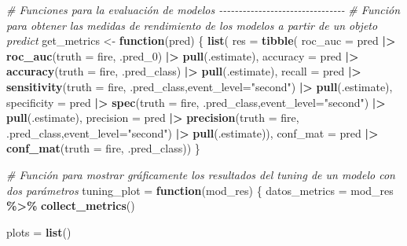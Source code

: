 \documentclass[12pt,a4paper,]{book}
\newenvironment{Shaded}{\begin{snugshade}}{\end{snugshade}}
\newcommand{\AttributeTok}[1]{\textcolor[rgb]{0.13,0.29,0.53}{#1}}
\newcommand{\CommentTok}[1]{\textcolor[rgb]{0.56,0.35,0.01}{\textit{#1}}}
\newcommand{\ControlFlowTok}[1]{\textcolor[rgb]{0.13,0.29,0.53}{\textbf{#1}}}
\newcommand{\FunctionTok}[1]{\textcolor[rgb]{0.13,0.29,0.53}{\textbf{#1}}}
\newcommand{\NormalTok}[1]{#1}
\newcommand{\OtherTok}[1]{\textcolor[rgb]{0.56,0.35,0.01}{#1}}
\newcommand{\SpecialCharTok}[1]{\textcolor[rgb]{0.81,0.36,0.00}{\textbf{#1}}}
\newcommand{\StringTok}[1]{\textcolor[rgb]{0.31,0.60,0.02}{#1}}
\numberwithin{dummy}{section}
\theoremstyle{ocrenumbox}
\theoremstyle{blacknumex}
\theoremstyle{blacknumbox}
\theoremstyle{ocrenum}
\theoremstyle{ocrenum}
\begin{document}
\begin{Shaded}
\begin{Highlighting}[]
\CommentTok{\# Funciones para la evaluación de modelos {-}{-}{-}{-}{-}{-}{-}{-}{-}{-}{-}{-}{-}{-}{-}{-}{-}{-}{-}{-}{-}{-}{-}{-}{-}{-}{-}{-}{-}{-}{-}{-}}
\CommentTok{\# Función para obtener las medidas de rendimiento de los modelos a partir de un objeto predict }
\NormalTok{get\_metrics }\OtherTok{\textless{}{-}} \ControlFlowTok{function}\NormalTok{(pred) \{}
  \FunctionTok{list}\NormalTok{(}
    \AttributeTok{res =} \FunctionTok{tibble}\NormalTok{(}
      \AttributeTok{roc\_auc =}\NormalTok{ pred }\SpecialCharTok{|\textgreater{}} \FunctionTok{roc\_auc}\NormalTok{(}\AttributeTok{truth =}\NormalTok{ fire, .pred\_0) }\SpecialCharTok{|\textgreater{}} \FunctionTok{pull}\NormalTok{(.estimate),}
      \AttributeTok{accuracy =}\NormalTok{ pred }\SpecialCharTok{|\textgreater{}} \FunctionTok{accuracy}\NormalTok{(}\AttributeTok{truth =}\NormalTok{ fire, .pred\_class) }\SpecialCharTok{|\textgreater{}} \FunctionTok{pull}\NormalTok{(.estimate),}
      \AttributeTok{recall =}\NormalTok{ pred }\SpecialCharTok{|\textgreater{}} \FunctionTok{sensitivity}\NormalTok{(}\AttributeTok{truth =}\NormalTok{ fire, .pred\_class,}\AttributeTok{event\_level=}\StringTok{"second"}\NormalTok{) }\SpecialCharTok{|\textgreater{}} \FunctionTok{pull}\NormalTok{(.estimate),}
      \AttributeTok{specificity =}\NormalTok{ pred }\SpecialCharTok{|\textgreater{}} \FunctionTok{spec}\NormalTok{(}\AttributeTok{truth =}\NormalTok{ fire, .pred\_class,}\AttributeTok{event\_level=}\StringTok{"second"}\NormalTok{) }\SpecialCharTok{|\textgreater{}} \FunctionTok{pull}\NormalTok{(.estimate),}
      \AttributeTok{precision =}\NormalTok{ pred }\SpecialCharTok{|\textgreater{}} \FunctionTok{precision}\NormalTok{(}\AttributeTok{truth =}\NormalTok{ fire, .pred\_class,}\AttributeTok{event\_level=}\StringTok{"second"}\NormalTok{) }\SpecialCharTok{|\textgreater{}} \FunctionTok{pull}\NormalTok{(.estimate)),}
    \AttributeTok{conf\_mat =}\NormalTok{ pred }\SpecialCharTok{|\textgreater{}} \FunctionTok{conf\_mat}\NormalTok{(}\AttributeTok{truth =}\NormalTok{ fire, .pred\_class))}
\NormalTok{\}}

\CommentTok{\# Función para mostrar gráficamente los resultados del tuning de un modelo con dos parámetros }
\NormalTok{tuning\_plot }\OtherTok{=} \ControlFlowTok{function}\NormalTok{(mod\_res) \{}
\NormalTok{  datos\_metrics }\OtherTok{=}\NormalTok{ mod\_res }\SpecialCharTok{\%\textgreater{}\%} 
    \FunctionTok{collect\_metrics}\NormalTok{()}

\NormalTok{  plots }\OtherTok{=} \FunctionTok{list}\NormalTok{()}
  

\end{Highlighting}
\end{Shaded}
\end{document}

